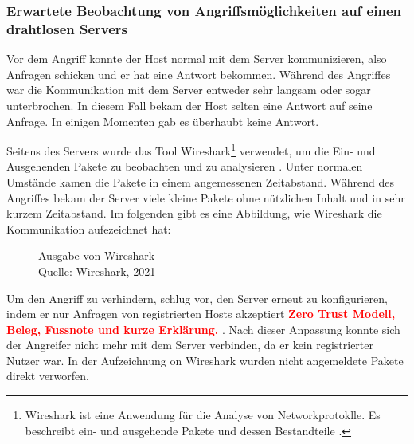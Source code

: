 \subsubsection{Erwartete Beobachtung von Angriffsmöglichkeiten auf einen drahtlosen Servers}
Vor dem Angriff konnte der Host normal mit dem Server kommunizieren, also Anfragen schicken und er hat eine Antwort bekommen.
Während des Angriffes war die Kommunikation mit dem Server entweder sehr langsam oder sogar unterbrochen. In diesem Fall
bekam der Host selten eine Antwort auf seine Anfrage. In einigen Momenten gab es überhaubt keine Antwort. 

Seitens des Servers wurde das Tool Wireshark\footnote{Wireshark ist eine Anwendung für die Analyse von Networkprotoklle.
Es beschreibt ein- und ausgehende Pakete und dessen Bestandteile \cite{refst:wisa}.} verwendet, um die Ein- und Ausgehenden
Pakete zu beobachten und zu analysieren \cite{refart:UBEC}. Unter normalen Umstände kamen die Pakete in einem angemessenen
Zeitabstand. Während des Angriffes bekam der Server viele kleine Pakete ohne nützlichen Inhalt und in sehr kurzem Zeitabstand.
Im folgenden gibt es eine Abbildung, wie Wireshark die Kommunikation aufezeichnet hat:

\begin{figure}[H]
  \caption{Ausgabe von Wireshark \\Quelle: Wireshark, 2021}
  \label{fig:refst_wisa}
\end{figure}

Um den Angriff zu verhindern, schlug \cite{refip:NYRS} vor, den Server erneut zu konfigurieren, indem er nur Anfragen von
registrierten Hosts akzeptiert \textcolor{red}{\textbf{Zero Trust Modell, Beleg, Fussnote und kurze Erklärung.}} . Nach dieser 
Anpassung konnte sich der Angreifer nicht mehr mit dem Server verbinden, da er kein registrierter Nutzer war. In der Aufzeichnung 
on Wireshark wurden nicht angemeldete Pakete direkt verworfen.


